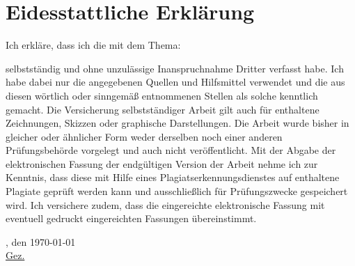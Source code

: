 \chapter*{Eidesstattliche Erklärung}
Ich erkläre, dass ich die \arbeit{} mit dem Thema:
\begin{quote}
	\textit{\titel}
\end{quote} 
selbstständig und ohne unzulässige Inanspruchnahme Dritter verfasst habe. Ich habe dabei nur die angegebenen Quellen und Hilfsmittel verwendet und die aus diesen wörtlich oder sinngemäß entnommenen Stellen als solche kenntlich gemacht. Die Versicherung selbstständiger Arbeit gilt auch für enthaltene Zeichnungen, Skizzen oder graphische Darstellungen. Die Arbeit wurde bisher in gleicher oder ähnlicher Form weder derselben noch einer anderen Prüfungsbehörde vorgelegt und auch nicht veröffentlicht. Mit der Abgabe der elektronischen Fassung der endgültigen Version der Arbeit nehme ich zur Kenntnis, dass diese mit Hilfe eines Plagiatserkennungsdienstes auf enthaltene Plagiate geprüft werden kann und ausschließlich für Prüfungszwecke gespeichert wird. Ich versichere zudem, dass die eingereichte elektronische Fassung mit eventuell gedruckt eingereichten Fassungen übereinstimmt.

\vspace{1cm}

\verfassungsort, den \today \\[0.5cm]
	{\underline{Gez. \autor}}
	{\makebox[6cm]{\hrulefill}}\\ 
\autorReverse
